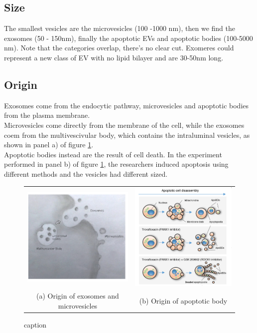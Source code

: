 \subsection{Size}
The smallest vesicles are the microvesicles (100 -1000 nm), then we find the exosomes (50 - 150nm), finally the apoptotic EVs and apoptotic bodies (100-5000 nm). Note that the categories overlap, there's no clear cut. Exomeres could represent a new class of EV with no lipid bilayer and are 30-50nm long.

\subsection{Origin}
Exosomes come from the endocytic pathway, microvesicles and apoptotic bodies from the plasma membrane.
\\
Microvesicles come directly from the membrane of the cell, while the exosomes coem from the multivescivular body, which contains the intraluminal vesicles, as shown in panel a) of figure \ref{fig:origin}. 
\\
Apoptotic bodies instead are the result of cell death. In the experiment performed in panel b) of figure \ref{fig:origin}, the researchers induced apoptosis using different methods and the vesicles had different sized.

\begin{figure}
\begin{tabular}{cc}
  \includegraphics[width=65mm]{origin1} &   \includegraphics[width=65mm]{origin2} \\
(a) Origin of exosomes and microvesicles & (b) Origin of apoptotic body \\[6pt]

\end{tabular}
\caption{caption}
\label{fig:origin}
\end{figure}

